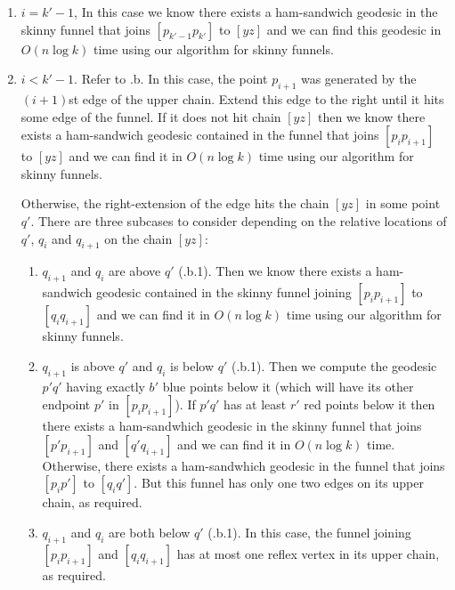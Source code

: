 \documentclass[charterfonts,lotsofwhite]{patmorin}
\newcommand{\chain}[2]{[#1#2]}
\begin{document}
\begin{enumerate}

\item $i=k'-1$, In this case we know there exists a ham-sandwich
geodesic in the skinny funnel that joins $\chain{p_{k'-1}}{p_{k'}}$ to
$\chain{y}{z}$ and we can find this geodesic in $O(n\log k)$ time using
our algorithm for skinny funnels.

\item $i < k'-1$.  Refer to .b. In this case, the
point $p_{i+1}$ was generated by the $(i+1)$st edge of the upper chain.
Extend this edge to the right until it hits some edge of the funnel.
If it does not hit chain $\chain{y}{z}$ then we know there exists a
ham-sandwich geodesic contained in the funnel that joins
$\chain{p_{i}}{p_{i+1}}$ to $\chain{y}{z}$ and we can find it in $O(n\log
k)$ time using our algorithm for skinny funnels.  

Otherwise, the right-extension of the edge hits the chain
$\chain{y}{z}$ in some point $q'$.  There are three subcases to
consider depending on the relative locations of $q'$, $q_i$ and
$q_{i+1}$ on the chain $\chain{y}{z}$:

\begin{enumerate}

\item $q_{i+1}$ and $q_i$ are above $q'$
(.b.1).  Then we know there exists
a ham-sandwich geodesic contained in the skinny funnel joining
$\chain{p_i}{p_{i+1}}$ to $\chain{q_i}{q_{i+1}}$ and we can find it in $O(
n\log k)$ time using our algorithm for skinny funnels.

\item $q_{i+1}$ is above $q'$ and $q_i$ is below $q'$
(.b.1).  Then we compute the geodesic $p'q'$
having exactly $b'$ blue points below it (which will have its other
endpoint $p'$ in $\chain{p_{i}}{p_{i+1}}$).  If $p'q'$ has at least
$r'$ red points below it then there exists a ham-sandwhich geodesic in
the skinny funnel that joins $\chain{p'}{p_{i+1}}$ and
$\chain{q'}{q_{i+1}}$ and we can find it in $O(n\log k)$ time.
Otherwise, there exists a ham-sandwhich geodesic in the funnel that
joins $\chain{p_i}{p'}$ to $\chain{q_i}{q'}$.  But this funnel has
only one two edges on its upper chain, as required.

\item $q_{i+1}$ and $q_{i}$ are both below $q'$
(.b.1).  In this case, the funnel joining
$\chain{p_i}{p_{i+1}}$ and $\chain{q_i}{q_{i+1}}$ has at most one reflex
vertex in its upper chain, as required.
\end{enumerate}

\end{enumerate}
\end{document}
